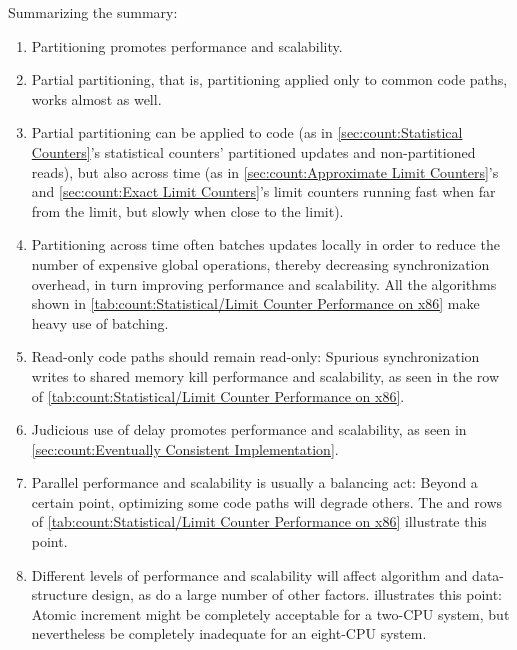 Summarizing the summary:

\begin{enumerate}
\item	Partitioning promotes performance and scalability.
\item	Partial partitioning, that is, partitioning applied only to
	common code paths, works almost as well.
\item	Partial partitioning can be applied to code (as in
	\cref{sec:count:Statistical Counters}'s statistical
	counters' partitioned updates and non-partitioned reads), but also
	across time (as in
	\cref{sec:count:Approximate Limit Counters}'s and
	\cref{sec:count:Exact Limit Counters}'s
	limit counters running fast when far from
	the limit, but slowly when close to the limit).
\item	Partitioning across time often batches updates locally
	in order to reduce the number of expensive global operations,
	thereby decreasing synchronization overhead, in turn
	improving performance and scalability.
	All the algorithms shown in
	\cref{tab:count:Statistical/Limit Counter Performance on x86}
	make heavy use of batching.
\item	Read-only code paths should remain read-only:
	Spurious synchronization writes to shared memory kill performance
	and scalability, as seen in the  row of
	\cref{tab:count:Statistical/Limit Counter Performance on x86}.
\item	Judicious use of delay promotes performance and scalability, as
	seen in \cref{sec:count:Eventually Consistent Implementation}.
\item	Parallel performance and scalability is usually a balancing act:
	Beyond a certain point, optimizing some code paths will degrade
	others.
	The  and  rows of
	\cref{tab:count:Statistical/Limit Counter Performance on x86}
	illustrate this point.
\item	Different levels of performance and scalability will affect
	algorithm and data-structure design, as do a large number of
	other factors.
	illustrates this point:
	Atomic increment might be completely acceptable for a two-CPU
	system, but nevertheless be completely inadequate for an eight-CPU system.
\end{enumerate}

